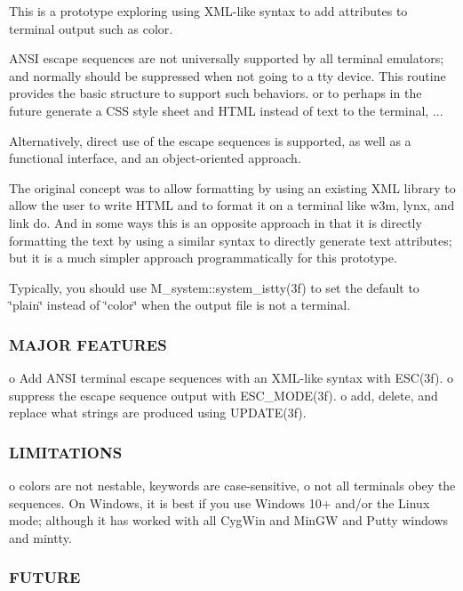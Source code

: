 This is a prototype exploring using X\+M\+L-\/like syntax to add attributes to terminal output such as color.

A\+N\+SI escape sequences are not universally supported by all terminal emulators; and normally should be suppressed when not going to a tty device. This routine provides the basic structure to support such behaviors. or to perhaps in the future generate a C\+SS style sheet and H\+T\+ML instead of text to the terminal, ...

Alternatively, direct use of the escape sequences is supported, as well as a functional interface, and an object-\/oriented approach.

The original concept was to allow formatting by using an existing X\+ML library to allow the user to write H\+T\+ML and to format it on a terminal like w3m, lynx, and link do. And in some ways this is an opposite approach in that it is directly formatting the text by using a similar syntax to directly generate text attributes; but it is a much simpler approach programmatically for this prototype.

Typically, you should use M\+\_\+system\+::system\+\_\+istty(3f) to set the default to \char`\"{}plain\char`\"{} instead of \char`\"{}color\char`\"{} when the output file is not a terminal.

\subsubsection*{M\+A\+J\+OR F\+E\+A\+T\+U\+R\+ES}

o Add A\+N\+SI terminal escape sequences with an X\+M\+L-\/like syntax with E\+S\+C(3f). o suppress the escape sequence output with E\+S\+C\+\_\+\+M\+O\+D\+E(3f). o add, delete, and replace what strings are produced using U\+P\+D\+A\+T\+E(3f).

\subsubsection*{L\+I\+M\+I\+T\+A\+T\+I\+O\+NS}

o colors are not nestable, keywords are case-\/sensitive, o not all terminals obey the sequences. On Windows, it is best if you use Windows 10+ and/or the Linux mode; although it has worked with all Cyg\+Win and Min\+GW and Putty windows and mintty.

\subsubsection*{F\+U\+T\+U\+RE}

